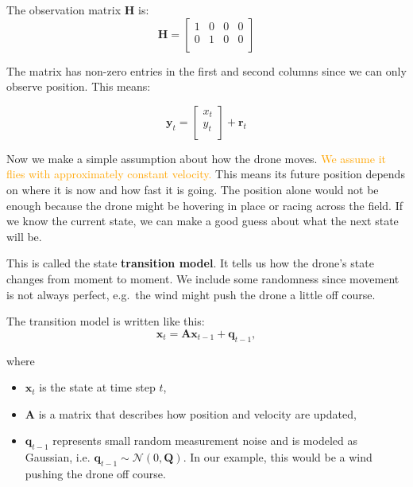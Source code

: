 \begin{example}
The observation matrix \textbf{H} is: 
\[\mathbf{H} = \begin{bmatrix}
   1 & 0 & 0 & 0\\
   0 & 1 & 0 & 0\\   
\end{bmatrix}\]

The matrix has non-zero entries in the first and second columns since we can only observe position. This means: 

\[\mathbf{y}_t = \begin{bmatrix}
   x_t \\
   y_t \\ 
\end{bmatrix} + \textbf{r}_t\]


\medskip 
Now we make a simple assumption about how the drone moves. %
\textcolor{orange}{We assume it flies with approximately constant velocity.} This means its future position depends on where it is now and how fast it is going. The position alone would not be enough because the drone might be hovering in place or racing across the field. If we know the current state, we can make a good guess about what the next state will be. 

This is called the state \textbf{transition model}. It tells us how the drone's state changes from moment to moment. We include some randomness since movement is not always perfect, e.g.~the wind might push the drone a little off course. 

The transition model is written like this: 
\begin{equation}\label{eq: transition model}
\textbf{x}_t = \textbf{A}\textbf{x}_{t-1}+\textbf{q}_{t-1},   
\end{equation}

where 
\begin{itemize}
    \item $\textbf{x}_t$ is the state at time step $t$,
    \item $\textbf{A}$ is a matrix that describes how position and velocity are updated, 
    \item $\mathbf{q}_{t-1}$ represents small random measurement noise and is modeled as Gaussian, i.e. $\mathbf{q}_{t-1} \sim \mathcal{N}(0, \mathbf{Q})$. In our example, this would be a wind pushing the drone off course. 
\end{itemize}


\end{example}
